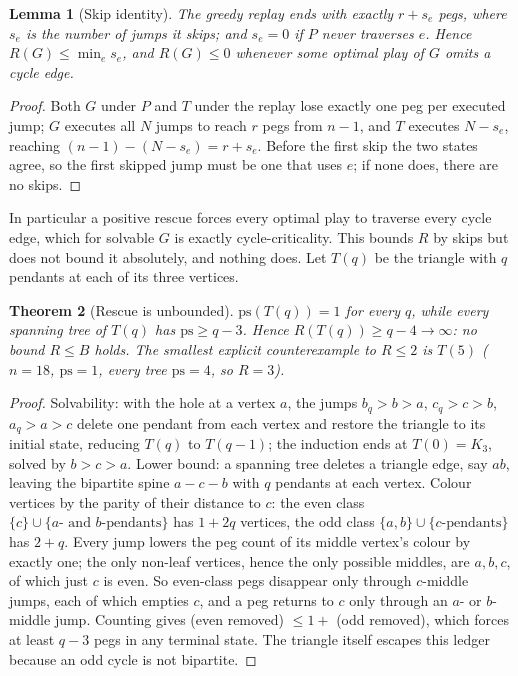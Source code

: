 \documentclass[11pt]{article}
\newtheorem{theorem}{Theorem}[section]
\newtheorem{lemma}[theorem]{Lemma}
\theoremstyle{definition}
\newcommand{\ps}{\mathrm{ps}}
\begin{document}
\begin{lemma}[Skip identity]\label{lem:skip}
The greedy replay ends with exactly $r+s_e$ pegs, where $s_e$ is the
number of jumps it skips; and $s_e=0$ if $P$ never traverses $e$.
Hence $R(G)\le\min_e s_e$, and $R(G)\le 0$ whenever some optimal play
of $G$ omits a cycle edge.
\end{lemma}

\begin{proof}
Both $G$ under $P$ and $T$ under the replay lose exactly one peg per
executed jump; $G$ executes all $N$ jumps to reach $r$ pegs from
$n{-}1$, and $T$ executes $N-s_e$, reaching $(n{-}1)-(N-s_e)=r+s_e$.
Before the first skip the two states agree, so the first skipped jump
must be one that uses $e$; if none does, there are no skips.
\end{proof}

In particular a positive rescue forces every optimal play to traverse
every cycle edge, which for solvable $G$ is exactly cycle-criticality.
This bounds $R$ by skips but does not bound it absolutely, and
nothing does. Let $T(q)$ be the triangle with $q$ pendants
at each of its three vertices.

\begin{theorem}[Rescue is unbounded]\label{thm:rescue}
$\ps(T(q))=1$ for every $q$, while every spanning tree of $T(q)$ has
$\ps\ge q-3$. Hence $R(T(q))\ge q-4\to\infty$: no bound $R\le B$
holds. The smallest explicit counterexample to $R\le 2$ is $T(5)$
($n=18$, $\ps=1$, every tree $\ps=4$, so $R=3$).
\end{theorem}

\begin{proof}
Solvability: with the hole at a vertex $a$, the jumps
$b_q\!>\!b\!>\!a$, $c_q\!>\!c\!>\!b$, $a_q\!>\!a\!>\!c$ delete one
pendant from each vertex and restore the triangle to its initial
state, reducing $T(q)$ to $T(q-1)$; the induction ends at
$T(0)=K_3$, solved by $b\!>\!c\!>\!a$. Lower bound: a spanning tree
deletes a triangle edge, say $ab$, leaving the bipartite spine
$a\!-\!c\!-\!b$ with $q$ pendants at each vertex. Colour vertices by
the parity of their distance to $c$: the even class
$\{c\}\cup\{a\text{- and }b\text{-pendants}\}$ has $1+2q$ vertices,
the odd class $\{a,b\}\cup\{c\text{-pendants}\}$ has $2+q$. Every jump
lowers the peg count of its middle vertex's colour by exactly one;
the only non-leaf vertices, hence the only possible middles, are
$a,b,c$, of which just $c$ is even. So even-class pegs disappear only
through $c$-middle jumps, each of which empties $c$, and a peg returns
to $c$ only through an $a$- or $b$-middle jump. Counting gives
(even removed) $\le 1+$ (odd removed), which forces at least $q-3$
pegs in any terminal state. The triangle itself escapes this ledger
because an odd cycle is not bipartite.
\end{proof}
\end{document}
